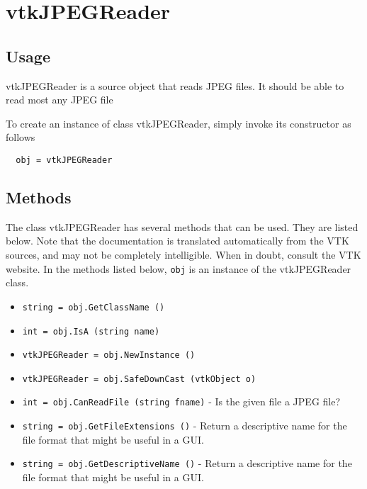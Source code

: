 \section{vtkJPEGReader}

\subsection{Usage}

 vtkJPEGReader is a source object that reads JPEG files.
 It should be able to read most any JPEG file


To create an instance of class vtkJPEGReader, simply
invoke its constructor as follows
\begin{verbatim}
  obj = vtkJPEGReader
\end{verbatim}
\subsection{Methods}

The class vtkJPEGReader has several methods that can be used.
  They are listed below.
Note that the documentation is translated automatically from the VTK sources,
and may not be completely intelligible.  When in doubt, consult the VTK website.
In the methods listed below, \verb|obj| is an instance of the vtkJPEGReader class.
\begin{itemize}
\item  \verb|string = obj.GetClassName ()|

\item  \verb|int = obj.IsA (string name)|

\item  \verb|vtkJPEGReader = obj.NewInstance ()|

\item  \verb|vtkJPEGReader = obj.SafeDownCast (vtkObject o)|

\item  \verb|int = obj.CanReadFile (string fname)| -  Is the given file a JPEG file?

\item  \verb|string = obj.GetFileExtensions ()| -  Return a descriptive name for the file format that might be useful in a GUI.

\item  \verb|string = obj.GetDescriptiveName ()| -  Return a descriptive name for the file format that might be useful in a GUI.

\end{itemize}
